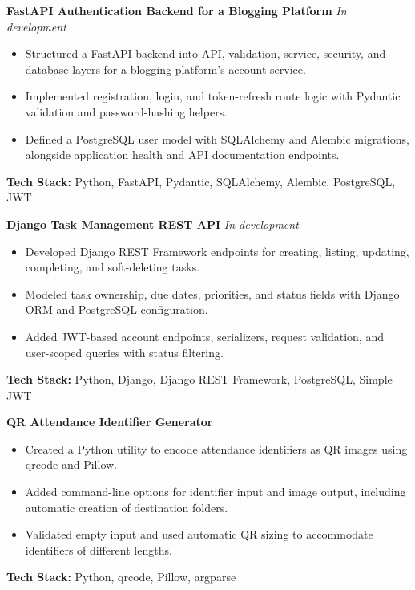 \noindent\textbf{FastAPI Authentication Backend for a Blogging Platform} \hfill\textit{In development}
\begin{itemize}[leftmargin=*,nosep,topsep=3pt]
  \item Structured a FastAPI backend into API, validation, service, security, and database layers for a blogging platform's account service.
  \item Implemented registration, login, and token-refresh route logic with Pydantic validation and password-hashing helpers.
  \item Defined a PostgreSQL user model with SQLAlchemy and Alembic migrations, alongside application health and API documentation endpoints.
\end{itemize}
\noindent\textbf{Tech Stack:} Python, FastAPI, Pydantic, SQLAlchemy, Alembic, PostgreSQL, JWT\par\medskip

\noindent\textbf{Django Task Management REST API} \hfill\textit{In development}
\begin{itemize}[leftmargin=*,nosep,topsep=3pt]
  \item Developed Django REST Framework endpoints for creating, listing, updating, completing, and soft-deleting tasks.
  \item Modeled task ownership, due dates, priorities, and status fields with Django ORM and PostgreSQL configuration.
  \item Added JWT-based account endpoints, serializers, request validation, and user-scoped queries with status filtering.
\end{itemize}
\noindent\textbf{Tech Stack:} Python, Django, Django REST Framework, PostgreSQL, Simple JWT\par\medskip

\noindent\textbf{QR Attendance Identifier Generator}
\begin{itemize}[leftmargin=*,nosep,topsep=3pt]
  \item Created a Python utility to encode attendance identifiers as QR images using qrcode and Pillow.
  \item Added command-line options for identifier input and image output, including automatic creation of destination folders.
  \item Validated empty input and used automatic QR sizing to accommodate identifiers of different lengths.
\end{itemize}
\noindent\textbf{Tech Stack:} Python, qrcode, Pillow, argparse\par\medskip

